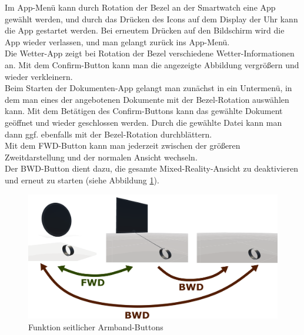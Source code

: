 \documentclass[11pt, a4paper]{article}
\begin{document}
Im App-Menü kann durch Rotation der Bezel an der Smartwatch eine App gewählt werden, und durch das Drücken des Icons auf dem Display der Uhr kann die App gestartet werden. Bei erneutem Drücken auf den Bildschirm wird die App wieder verlassen, und man gelangt zurück ins App-Menü.\\
Die Wetter-App zeigt bei Rotation der Bezel verschiedene Wetter-Informationen an. Mit dem Confirm-Button kann man die angezeigte Abbildung vergrößern und wieder verkleinern.\\
Beim Starten der Dokumenten-App gelangt man zunächst in ein Untermenü, in dem man eines der angebotenen Dokumente mit der Bezel-Rotation auswählen kann. Mit dem Betätigen des Confirm-Buttons kann das gewählte Dokument geöffnet und wieder geschlossen werden. Durch die gewählte Datei kann man dann ggf. ebenfalls mit der Bezel-Rotation durchblättern.\\
Mit dem FWD-Button kann man jederzeit zwischen der größeren Zweitdarstellung und der normalen Ansicht wechseln. \\
Der BWD-Button dient dazu, die gesamte Mixed-Reality-Ansicht zu deaktivieren und erneut zu starten (siehe Abbildung \ref{fig:button_behavior}).

\begin{figure}[h]
	\centering
	\includegraphics[scale=.5]{doc/assets/Darstellungen.png}
	\caption{Funktion seitlicher Armband-Buttons}
	\label{fig:button_behavior}
\end{figure}

\newpage

\listoffigures
\end{document}
